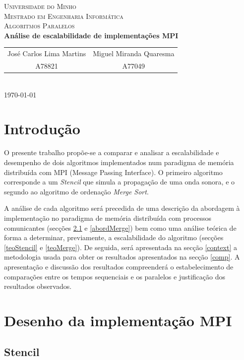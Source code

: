 \documentclass{article}
\begin{document}
{
\center
\textsc{\Large Universidade do Minho} \\ [0.5cm]
\textsc{\Large Mestrado em Engenharia Informática} \\ [0.5cm]
\textsc{\large Algoritmos Paralelos} \\ [0.5cm]

{\LARGE \bfseries Análise de escalabilidade de implementações MPI}\\[0.5cm]

\begin{tabular}{c c}
    José Carlos Lima Martins & Miguel Miranda Quaresma \\
    A78821 & A77049  \\
\end{tabular} \\[0.5cm]

\today \\[1cm]
}

\section{Introdução}
O presente trabalho propõe-se a comparar e analisar a escalabilidade e desempenho de dois algoritmos implementados num paradigma de memória distribuída com MPI 
(Message Passing Interface). O primeiro algoritmo corresponde a um \textit{Stencil} que simula a propagação de uma onda sonora, e o segundo ao algoritmo de ordenação \textit{Merge Sort}.

A análise de cada algoritmo será precedida de uma descrição da abordagem à implementação no paradigma de memória distribuída com processos comunicantes (secções 
\ref{abordStencil} e \ref{abordMerge}) bem como uma análise teórica de forma a determinar, previamente, a escalabilidade do algoritmo (secções \ref{teoStencil} e 
\ref{teoMerge}). De seguida, será apresentada na secção \ref{context} a metodologia usada para obter os resultados apresentados na secção \ref{comp}. 
A apresentação e discussão dos resultados compreenderá o estabelecimento de comparações entre os tempos sequenciais e os paralelos e justificação dos resultados 
observados. 

\section{Desenho da implementação MPI}

\subsection{Stencil} \label{abordStencil}
\end{document}
